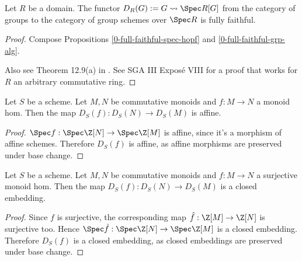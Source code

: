 \begin{theorem}
  \label{0-full-faithful-diag}
  \lean{}
  \leanok

  Let $R$ be a domain.
  The functor $D_R(G) := G \rightsquigarrow \Spec R[G]$ from the category of groups to the category of group schemes over $\Spec R$ is fully faithful.
\end{theorem}
\begin{proof}
  \leanok

  Compose Propositions \ref{0-full-faithful-spec-hopf} and \ref{0-full-faithful-grp-alg}.

  Also see Theorem 12.9(a) in \cite{Milne_2017}. See SGA III Exposé VIII for a proof that works for $R$ an arbitrary commutative ring.
\end{proof}


\begin{proposition}
  \label{0-diag-aff-hom}

  Let $S$ be a scheme.
  Let $M, N$ be commutative monoids and $f : M \to N$ a monoid hom.
  Then the map $D_S(f) : D_S(N) \to D_S(M)$ is affine.
\end{proposition}
\begin{proof}
  \uses{}

  $\Spec f : \Spec \Z[N] \to \Spec \Z[M]$ is affine, since it's a morphism of affine schemes.
  Therefore $D_S(f)$ is affine, as affine morphisms are preserved under base change.
\end{proof}


\begin{proposition}
  \label{0-diag-closed-emb}

  Let $S$ be a scheme.
  Let $M, N$ be commutative monoids and $f : M \to N$ a surjective monoid hom.
  Then the map $D_S(f) : D_S(N) \to D_S(M)$ is a closed embedding.
\end{proposition}
\begin{proof}
  \uses{}

  Since $f$ is surjective, the corresponding map $\hat f : \Z[M] \to \Z[N]$ is surjective too.
  Hence $\Spec \hat f : \Spec \Z[N] \to \Spec \Z[M]$ is a closed embedding.
  Therefore $D_S(f)$ is a closed embedding, as closed embeddings are preserved under base change.
\end{proof}


